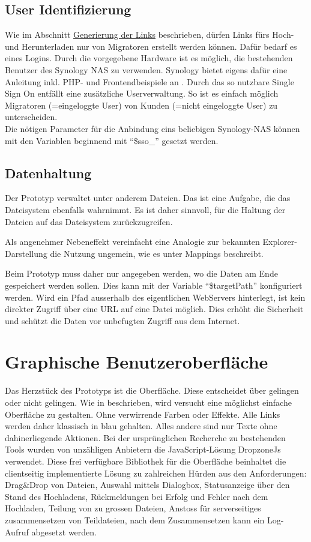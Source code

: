 \subsection{User Identifizierung}
Wie im Abschnitt \hyperref[subsec:Links]{Generierung der Links} beschrieben, dürfen Links fürs Hoch- und Herunterladen nur 
von Migratoren erstellt werden können. Dafür bedarf es eines Logins. Durch die vorgegebene Hardware ist es möglich, 
die bestehenden Benutzer des Synology NAS zu verwenden. Synology bietet eigens dafür eine Anleitung inkl. PHP- und Frontendbeispiele an \cite{Synology}.
Durch das so nutzbare Single Sign On entfällt eine zusätzliche Userverwaltung. 
So ist es einfach möglich Migratoren (=eingeloggte User) von Kunden (=nicht eingeloggte User) zu unterscheiden.
\\ 
Die nötigen Parameter für die Anbindung eins beliebigen Synology-NAS können mit den Variablen beginnend mit ``\$sso\_'' gesetzt werden.

\subsection{Datenhaltung}
Der Prototyp verwaltet unter anderem Dateien. Das ist eine Aufgabe, die das Dateisystem ebenfalls wahrnimmt.
Es ist daher sinnvoll, für die Haltung der Dateien auf das Dateisystem zurückzugreifen. 

Als angenehmer Nebeneffekt vereinfacht eine Analogie zur bekannten Explorer-Darstellung die Nutzung ungemein, wie es \cite[p.~76f]{Butz} unter Mappings beschreibt.

Beim Prototyp muss daher nur angegeben werden, wo die Daten am Ende gespeichert werden sollen. 
Dies kann mit der Variable ``\$targetPath'' konfiguriert werden. 
Wird ein Pfad ausserhalb des eigentlichen WebServers hinterlegt, ist kein direkter Zugriff über eine URL auf eine Datei möglich.
Dies erhöht die Sicherheit und schützt die Daten vor unbefugten Zugriff aus dem Internet.

\section{Graphische Benutzeroberfläche}
Das Herzstück des Prototyps ist die Oberfläche. Diese entscheidet über gelingen oder nicht gelingen.
Wie in \cite[p.~74ff]{Butz} beschrieben, wird versucht eine möglichst einfache Oberfläche zu gestalten. Ohne verwirrende Farben oder Effekte.
Alle Links werden daher klassisch in blau gehalten. Alles andere sind nur Texte ohne dahinerliegende Aktionen.
Bei der ursprünglichen Recherche zu bestehenden Tools wurden von unzähligen Anbietern die JavaScript-Lösung DropzoneJs verwendet.
Diese frei verfügbare Bibliothek für die Oberfläche beinhaltet die clientseitig implementierte Lösung zu zahlreichen Hürden aus den Anforderungen:
Drag\&Drop von Dateien, 
Auswahl mittels Dialogbox, 
Statusanzeige über den Stand des Hochladens,
Rückmeldungen bei Erfolg und Fehler nach dem Hochladen,
Teilung von zu grossen Dateien, 
Anstoss für serverseitiges zusammensetzen von Teildateien,
nach dem Zusammensetzen kann ein Log-Aufruf abgesetzt werden.

